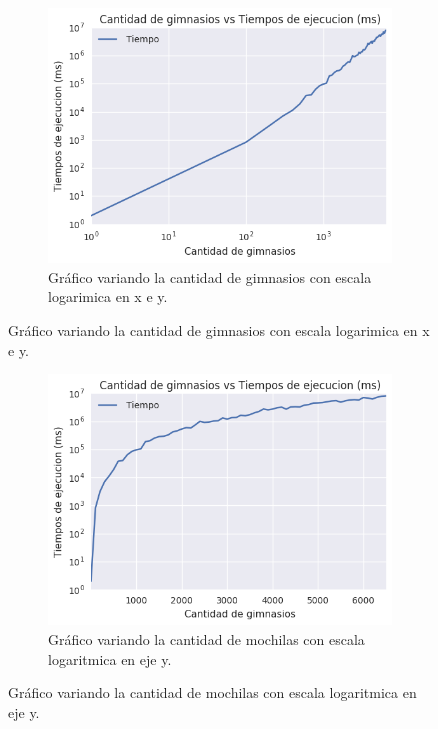\begin{figure}[H]
\begin{center}
    \begin{subfigure}[b]{0.49\textwidth}
        \includegraphics[width=\textwidth]{img/ejercicio2/losPosta/grafico_2log.png}
        \caption{Gráfico variando la cantidad de gimnasios con escala logarimica en x e y.}
        \label{fig: ejercicio1_ejemplo_camino1_2}
  \end{subfigure}

  \end{center}
\end{figure}
 	  
\begin{figure}[H] 
 \begin{center}
	\begin{subfigure}[b]{0.59\textwidth}
        \includegraphics[width=\textwidth]{img/ejercicio2/losPosta/grafico_logy.png}
        \caption{Gráfico variando la cantidad de mochilas con escala logaritmica en eje y.}
        \label{fig: ejercicio1_ejemplo_camino1_2}
 \end{subfigure}
  \end{center}
\end{figure}

